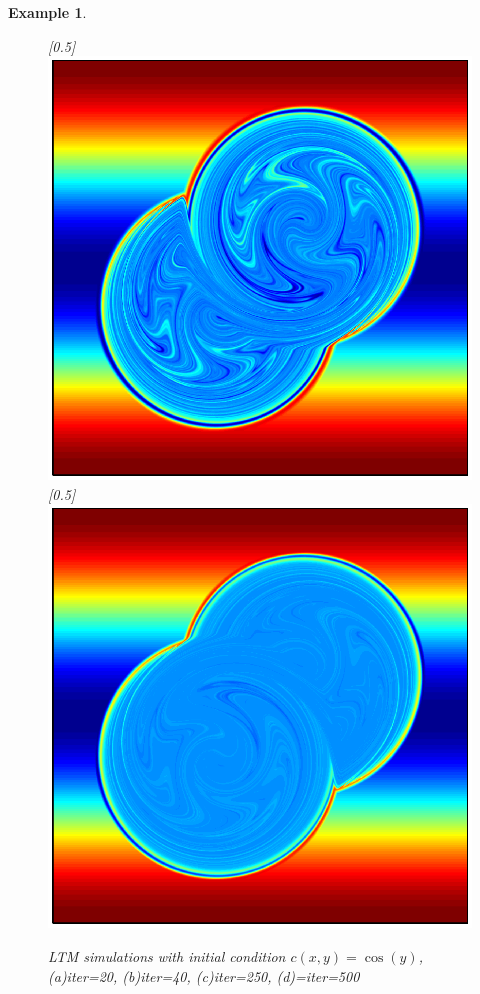 \documentclass{article}
\newtheorem{example}{Example}
\begin{document}
\begin{example}
\begin{figure}
{  }
  \centerline{
  \scalebox{0.5}[0.5]{\includegraphics{ltmiter250.eps}}
  \scalebox{0.5}[0.5]{\includegraphics{ltmiter500.eps}}
  }
  \caption{LTM simulations with initial condition $c(x,y)=\cos(y)$,
          (a)iter=20, (b)iter=40, (c)iter=250, (d)=iter=500}
  \label{ltmiter}
\end{figure}



\end{example}
\end{document}
